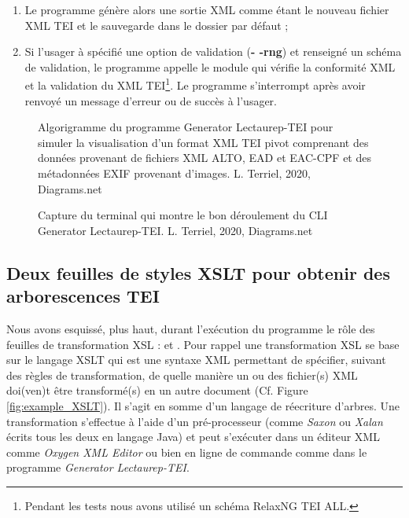 \begin{enumerate}
    \item Le programme génère alors une sortie XML comme étant le nouveau fichier XML TEI et le sauvegarde dans le dossier par défaut 
    ;
    \item Si l'usager à spécifié une option de validation (\textbf{- -rng}) et renseigné un schéma de validation, le programme appelle le module  qui vérifie la conformité XML et la validation du XML TEI\footnote{Pendant les tests nous avons utilisé un schéma RelaxNG TEI ALL.}. Le programme s'interrompt après avoir renvoyé un message d'erreur ou de succès à l'usager.
\end{enumerate}
\begin{figure}[H]
    \centering
    \centerline{}
    \caption{Algorigramme du programme Generator Lectaurep-TEI pour simuler la visualisation d'un format XML TEI pivot comprenant des données provenant de fichiers XML ALTO, EAD et EAC-CPF et des métadonnées EXIF provenant d'images.   \textcopyright L. Terriel, 2020, Diagrams.net}
    \label{fig:generateur_tei}
\end{figure}
\begin{figure}[h]
    \centering
    \centerline{}
    \caption{Capture du terminal qui montre le bon déroulement du CLI Generator Lectaurep-TEI.   \textcopyright L. Terriel, 2020, Diagrams.net}
    \label{fig:prompt-lec-tei}
\end{figure}

\subsection{Deux feuilles de styles XSLT pour obtenir des arborescences TEI}

Nous avons esquissé, plus haut, durant l'exécution du programme le rôle des feuilles de transformation XSL :  et . Pour rappel une transformation XSL se base sur le langage XSLT qui est une syntaxe XML permettant de spécifier, suivant des règles de transformation, de quelle manière un ou des fichier(s) XML doi(ven)t être transformé(s) en un autre document (Cf. Figure \ref{fig:example_XSLT}). Il s'agit en somme d'un langage de réecriture d'arbres. Une transformation s'effectue à l'aide d'un pré-processeur (comme \textit{Saxon} ou \textit{Xalan} écrits tous les deux en langage Java) et peut s'exécuter dans un éditeur XML comme \textit{Oxygen XML Editor} ou bien en ligne de commande comme dans le programme \textit{Generator Lectaurep-TEI}.\\

